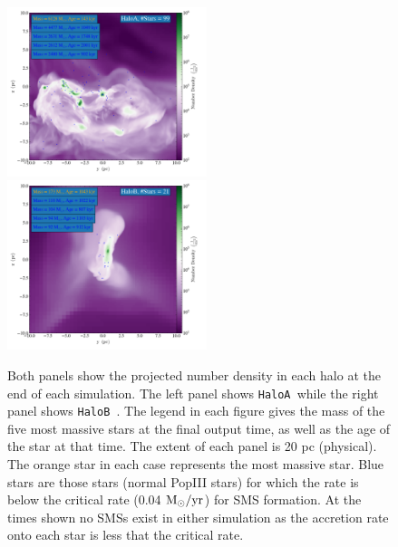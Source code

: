 \documentclass[graphics, twocolumn, usenatbib]{mn2e}
\newcommand{\msolaryrc} {$\rm{M_{\odot}/yr}$}
\newcommand{\ha} {\texttt{HaloA~}}
\newcommand{\hb} {\texttt{HaloB~}}
\begin{document}
\begin{figure}
\centering
\begin{minipage}{175mm}      \begin{center} 
\centerline{
\includegraphics[width=0.52\textwidth]{FIGURES/HaloA/Proj_z_number_density_2001.png}
\includegraphics[width=0.52\textwidth]{FIGURES/HaloB/Proj_z_number_density_1103.png}}
\caption{Both panels show the projected number density in each halo at the end of each simulation. The
  left panel shows \ha while the right panel shows \hb.
  The legend in each figure gives the mass of the five most massive stars at the final output time, as well as
  the age of the star at that time. The extent of each panel is 20 pc (physical). The orange
  star in each case represents the most massive star. Blue stars are those stars (normal PopIII stars) for
  which the rate is below the critical rate (0.04 \msolaryrc) for SMS formation. At the times shown no
  SMSs exist in either simulation
  as the accretion rate onto each star is less that the critical rate. }  \label{Fig:ProjectionEnd}
\end{center} \end{minipage}

\end{figure}
\end{document}
